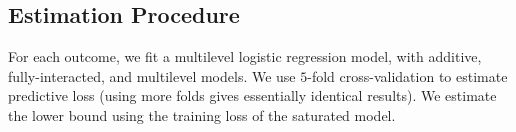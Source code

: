 \documentclass[sii]{ipart}
\begin{document}


\subsection{Estimation Procedure}
For each outcome, we fit a multilevel logistic regression model, with additive,
fully-interacted, and multilevel models. We use $5$-fold cross-validation to
estimate predictive loss (using more folds gives essentially identical results).
We estimate the lower bound using the training loss of the saturated model.
\end{document}
